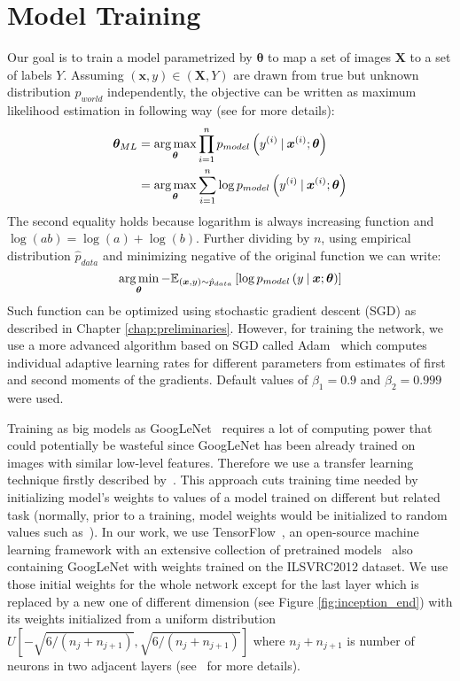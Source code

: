 \section{Model Training}
Our goal is to train a model parametrized by $\bm{\theta}$ to map a set of images $\bm{X}$ to a set of labels $Y$. Assuming $(\bm{x},y)\in(\bm{X},Y)$ are drawn from true but unknown distribution $p_{world}$ independently, the objective can be written as maximum likelihood estimation in following way (see \cite{Goodfellow-et-al-2016} for more details):
\begin{align}
\bm{\theta}_{ML} &=\mathop{\arg\max}_{\bm{\theta}}\prod\limits_{i=1}^{n} p_{model}\left(y^{(i)}\:\vert\:\bm{x}^{(i)};\bm{\theta}\right) \\
&=\mathop{\arg\max}_{\bm{\theta}}\sum\limits_{i=1}^{n} \log p_{model}\left(y^{(i)}\:\vert\:\bm{x}^{(i)};\bm{\theta}\right)
\end{align}
The second equality holds because logarithm is always increasing function and $\log(ab)=\log(a)+\log(b)$. Further dividing by $n$, using empirical distribution $\hat{p}_{data}$ and minimizing negative of the original function we can write:
\begin{equation}
\mathop{\arg\min}_{\bm{\theta}}-\mathbb{E}_{(\bm{x},y)\sim \hat{p}_{data}}\left[\log p_{model}\left(y\:\vert\:\bm{x};\bm{\theta}\right)\right]\label{eq:mle}
\end{equation}
Such function can be optimized using stochastic gradient descent (SGD) as described in Chapter \ref{chap:preliminaries}. However, for training the network, we use a more advanced algorithm based on SGD called Adam~\cite{adam} which computes individual adaptive learning rates for
different parameters from estimates of first and second moments of the gradients. Default values of $\beta_1 = 0.9$ and $\beta_2 = 0.999$ were used.

Training as big models as GoogLeNet~\cite{szegedy2015going} requires a lot of computing power that could potentially be wasteful since GoogLeNet has been already trained on images with similar low-level features. Therefore we use a transfer learning technique firstly described by~\cite{donahue2014decaf}. This approach cuts training time needed by initializing model's weights to values of a model trained on different but related task (normally, prior to a training, model weights would be initialized to random values such as~\cite{glorot2010understanding}). In our work, we use TensorFlow~\cite{tensorflow2015}, an open-source machine learning framework with an extensive collection of pretrained models~\cite{TFmodels} also containing GoogLeNet with weights trained on the ILSVRC2012 dataset. We use those initial weights for the whole network except for the last layer which is replaced by a new one of different dimension (see Figure \ref{fig:inception_end}) with its weights initialized from a uniform distribution $U\left[-\sqrt{6/(n_j+n_{j+1})}, \sqrt{6/(n_j+n_{j+1})}\right]$ where $n_j+n_{j+1}$ is number of neurons in two adjacent layers (see~\cite{glorot2010understanding} for more details).

